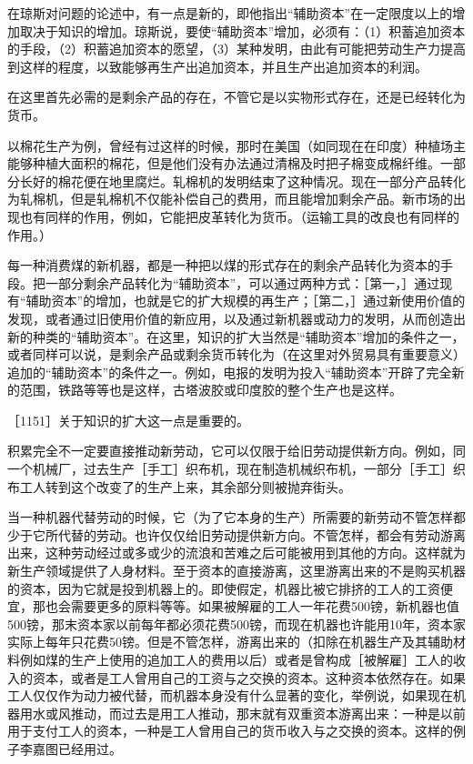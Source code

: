 在琼斯对问题的论述中，有一点是新的，即他指出“辅助资本”在一定限度以上的增加取决于知识的增加。琼斯说，要使“辅助资本”增加，必须有：（1）积蓄追加资本的手段，（2）积蓄追加资本的愿望，（3）某种发明，由此有可能把劳动生产力提高到这样的程度，以致能够再生产出追加资本，并且生产出追加资本的利润。

在这里首先必需的是剩余产品的存在，不管它是以实物形式存在，还是已经转化为货币。

以棉花生产为例，曾经有过这样的时候，那时在美国（如同现在在印度）种植场主能够种植大面积的棉花，但是他们没有办法通过清棉及时把子棉变成棉纤维。一部分长好的棉花便在地里腐烂。轧棉机的发明结束了这种情况。现在一部分产品转化为轧棉机，但是轧棉机不仅能补偿自己的费用，而且能增加剩余产品。新市场的出现也有同样的作用，例如，它能把皮革转化为货币。（运输工具的改良也有同样的作用。）

每一种消费煤的新机器，都是一种把以煤的形式存在的剩余产品转化为资本的手段。把一部分剩余产品转化为“辅助资本”，可以通过两种方式：［第一，］通过现有“辅助资本”的增加，也就是它的扩大规模的再生产；［第二，］通过新使用价值的发现，或者通过旧使用价值的新应用，以及通过新机器或动力的发明，从而创造出新的种类的“辅助资本”。在这里，知识的扩大当然是“辅助资本”增加的条件之一，或者同样可以说，是剩余产品或剩余货币转化为（在这里对外贸易具有重要意义）追加的“辅助资本”的条件之一。例如，电报的发明为投入“辅助资本”开辟了完全新的范围，铁路等等也是这样，古塔波胶或印度胶的整个生产也是这样。

［1151］关于知识的扩大这一点是重要的。

积累完全不一定要直接推动新劳动，它可以仅限于给旧劳动提供新方向。例如，同一个机械厂，过去生产［手工］织布机，现在制造机械织布机，一部分［手工］织布工人转到这个改变了的生产上来，其余部分则被抛弃街头。

当一种机器代替劳动的时候，它（为了它本身的生产）所需要的新劳动不管怎样都少于它所代替的劳动。也许仅仅给旧劳动提供新方向。不管怎样，都会有劳动游离出来，这种劳动经过或多或少的流浪和苦难之后可能被用到其他的方向。这样就为新生产领域提供了人身材料。至于资本的直接游离，这里游离出来的不是购买机器的资本，因为它就是投到机器上的。即使假定，机器比被它排挤的工人的工资便宜，那也会需要更多的原料等等。如果被解雇的工人一年花费500镑，新机器也值500镑，那末资本家以前每年都必须花费500镑，而现在机器也许能用10年，资本家实际上每年只花费50镑。但是不管怎样，游离出来的（扣除在机器生产及其辅助材料例如煤的生产上使用的追加工人的费用以后）或者是曾构成［被解雇］工人的收入的资本，或者是工人曾用自己的工资与之交换的资本。这种资本依然存在。如果工人仅仅作为动力被代替，而机器本身没有什么显著的变化，举例说，如果现在机器用水或风推动，而过去是用工人推动，那末就有双重资本游离出来：一种是以前用于支付工人的资本，一种是工人曾用自己的货币收入与之交换的资本。这样的例子李嘉图已经用过。

